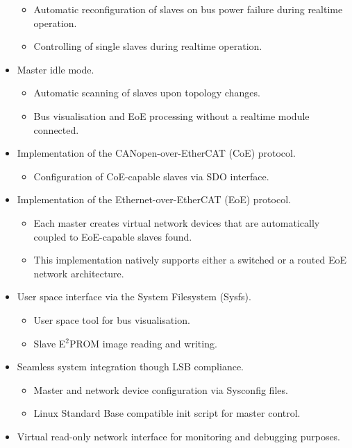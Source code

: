 \documentclass[a4paper,12pt,BCOR6mm,bibtotoc,idxtotoc]{scrbook}
\begin{document}
\begin{itemize}
\begin{itemize}
  \item Automatic reconfiguration of slaves on bus power failure
    during realtime operation.
  \item Controlling of single slaves during realtime operation.
  \end{itemize}
\item Master idle mode.
  \begin{itemize}
  \item Automatic scanning of slaves upon topology changes.
  \item Bus visualisation and EoE processing without a realtime module
    connected.
  \end{itemize}
\item Implementation of the CANopen-over-EtherCAT (CoE) protocol.
  \begin{itemize}
  \item Configuration of CoE-capable slaves via SDO interface.
  \end{itemize}
\item Implementation of the Ethernet-over-EtherCAT (EoE) protocol.
  \begin{itemize}
  \item Each master creates virtual network devices that are
    automatically coupled to EoE-cap\-able slaves found.
  \item This implementation natively supports either a switched or a
    routed EoE network architecture.
  \end{itemize}
\item User space interface via the System Filesystem
  (Sysfs).
  \begin{itemize}
  \item User space tool for bus visualisation.
  \item Slave E$^2$PROM image reading and writing.
  \end{itemize}
\item Seamless system integration though LSB compliance.
  \begin{itemize}
  \item Master and network device configuration via Sysconfig files.
  \item Linux Standard Base compatible init script for master control.
  \end{itemize}
\item Virtual read-only network interface for monitoring and debugging
  purposes.
\end{itemize}
\end{document}
